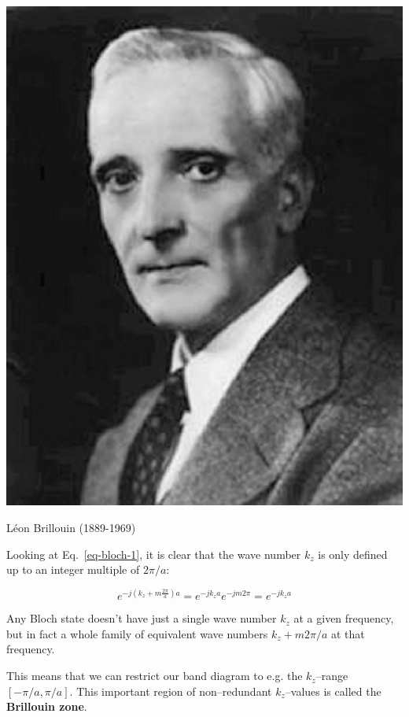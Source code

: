 \begin{marginfigure}[-0.0cm]
\includegraphics{symmetry/figures/l_brillouin}
\caption{L\'{e}on Brillouin (1889-1969)}
\end{marginfigure}

Looking at Eq.~\ref{eq-bloch-1}, it is clear that the wave number $k_z$ is only defined up to an integer multiple of $2 \pi/a$:

\begin{equation}
e^{-j (k_z + m\frac{2 \pi}{a} ) a} = e^{-j k_z a} e^{-j m 2 \pi} = e^{-j k_z a}
\end{equation} 

Any Bloch state doesn't have just a single wave number $k_z$ at a given frequency, but in fact a whole family of equivalent wave numbers $k_z+m 2 \pi /a$ at that frequency.

This means that we can restrict our band diagram to e.g. the $k_z$--range $[-\pi/a,\pi/a]$. This important region of non--redundant $k_z$--values is called the \textbf{Brillouin zone}.

